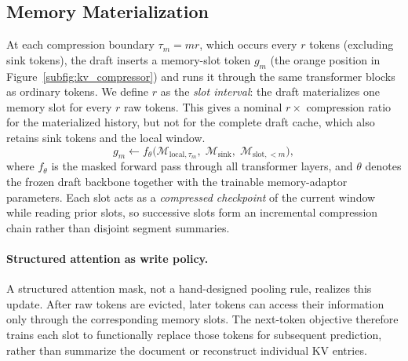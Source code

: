 \subsection{Memory Materialization}
\label{subsec:memory_materialization}

At each compression boundary $\tau_m = mr$, which occurs every $r$ tokens (excluding sink tokens), the draft inserts a memory-slot token $g_m$ (the orange position in Figure~\ref{subfig:kv_compressor}) and runs it through the same transformer blocks as ordinary tokens.
We define $r$ as the \emph{slot interval}: the draft materializes one memory slot for every $r$ raw tokens.
This gives a nominal $r\times$ compression ratio for the materialized history, but not for the complete draft cache, which also retains sink tokens and the local window.
\begin{equation*}
    g_m \leftarrow f_{\theta}\!\bigl(
        \mathcal{M}_{\mathrm{local},\tau_m},\;
        \mathcal{M}_{\mathrm{sink}},\;
        \mathcal{M}_{\mathrm{slot},<m}
    \bigr),
\end{equation*}
where $f_{\theta}$ is the masked forward pass through all transformer layers, and $\theta$ denotes the frozen draft backbone together with the trainable memory-adaptor parameters.
Each slot acts as a \emph{compressed checkpoint} of the current window while reading prior slots, so successive slots form an incremental compression chain rather than disjoint segment summaries.

\paragraph{Structured attention as write policy.}
A structured attention mask, not a hand-designed pooling rule, realizes this update.
After raw tokens are evicted, later tokens can access their information only through the corresponding memory slots.
The next-token objective therefore trains each slot to functionally replace those tokens for subsequent prediction, rather than summarize the document or reconstruct individual KV entries.


